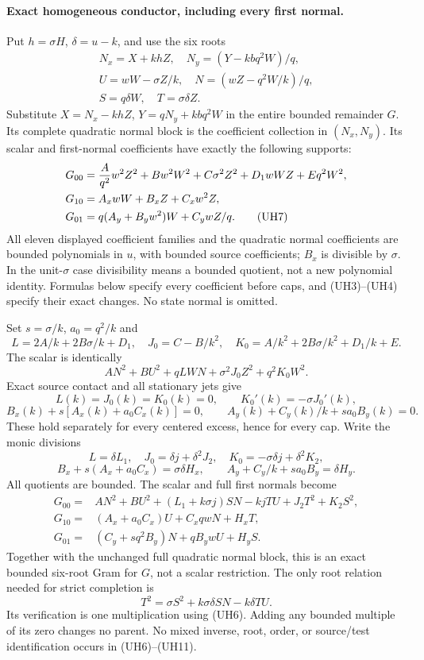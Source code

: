\paragraph{Exact homogeneous conductor, including every first normal.}
Put $h=\sigma H$, $\delta=u-k$, and use the six roots
\[
\begin{gathered}
 N_x=X+khZ,\quad N_y=(Y-kbq^2W)/q,\\
 U=wW-\sigma Z/k,\quad N=(wZ-q^2W/k)/q,\\
 S=q\delta W,\quad T=\sigma\delta Z.
\end{gathered}                                     \tag{UH6}
\]
Substitute $X=N_x-khZ$, $Y=qN_y+kbq^2W$ in the entire
bounded remainder $G$. Its complete quadratic normal block is the
coefficient collection in $(N_x,N_y)$. Its scalar and first-normal
coefficients have exactly the following supports:
\begin{align*}
 G_{00}&={A\over q^2}w^2Z^2+B w^2W^2+C\sigma^2 Z^2
                  +D_1 wWZ+E q^2W^2,\\
 G_{10}&=A_xwW+B_xZ+C_xw^2Z,\\
 G_{01}&=q(A_y+B_yw^2)W+C_ywZ/q.                    \tag{UH7}
\end{align*}
All eleven displayed coefficient families and the quadratic normal
coefficients are bounded polynomials in $u$, with bounded source
coefficients; $B_x$ is divisible by $\sigma$. In the unit-$\sigma$
case divisibility means a bounded quotient, not a new polynomial
identity. Formulas below specify every coefficient before caps, and
(UH3)--(UH4) specify their exact changes. No state normal is omitted.

Set $s=\sigma/k$, $a_0=q^2/k$ and
\[
 L=2A/k+2B\sigma/k+D_1,\quad
 J_0=C-B/k^2,\quad K_0=A/k^2+2B\sigma/k^2+D_1/k+E.
\]
The scalar is identically
\[
 A N^2+B U^2+qLWN+\sigma^2J_0Z^2+q^2K_0W^2.       \tag{UH8}
\]
Exact source contact and all stationary jets give
\[
 L(k)=J_0(k)=K_0(k)=0,\qquad K_0'(k)=-\sigma J_0'(k),
\]
\[
 B_x(k)+s[A_x(k)+a_0C_x(k)]=0,\qquad
 A_y(k)+C_y(k)/k+s a_0B_y(k)=0.                    \tag{UH9}
\]
These hold separately for every centered excess, hence for every cap.
Write the monic divisions
\[
 L=\delta L_1,\quad J_0=\delta j+\delta^2J_2,\quad
 K_0=-\sigma\delta j+\delta^2K_2,
\]
\[
 B_x+s(A_x+a_0C_x)=\sigma\delta H_x,\qquad
 A_y+C_y/k+s a_0B_y=\delta H_y.
\]
All quotients are bounded. The scalar and full first normals become
\begin{align*}
 G_{00}={}&A N^2+B U^2+(L_1+k\sigma j)SN-kjTU
                          +J_2T^2+K_2S^2,\\
 G_{10}={}&(A_x+a_0C_x)U+C_xqwN+H_xT,\\
 G_{01}={}&(C_y+s q^2B_y)N+qB_ywU+H_yS.            \tag{UH10}
\end{align*}
Together with the unchanged full quadratic normal block, this is an
exact bounded six-root Gram for $G$, not a scalar restriction.
The only root relation needed for strict completion is
\[
 T^2=\sigma S^2+k\sigma\delta SN-k\delta TU.        \tag{UH11}
\]
Its verification is one multiplication using (UH6). Adding any bounded
multiple of its zero changes no parent. No mixed inverse, root, order,
or source/test identification occurs in (UH6)--(UH11).

